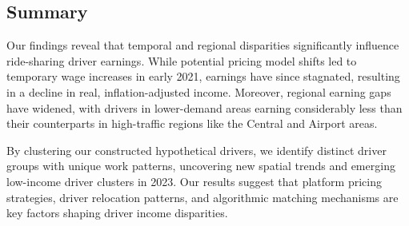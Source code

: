 \subsection{Summary}

Our findings reveal that temporal and regional disparities significantly influence ride-sharing driver earnings. While potential pricing model shifts led to temporary wage increases in early 2021, earnings have since stagnated, resulting in a decline in real, inflation-adjusted income. Moreover, regional earning gaps have widened, with drivers in lower-demand areas earning considerably less than their counterparts in high-traffic regions like the Central and Airport areas.

By clustering our constructed hypothetical drivers, we identify distinct driver groups with unique work patterns, uncovering new spatial trends and emerging low-income driver clusters in 2023. Our results suggest that platform pricing strategies, driver relocation patterns, and algorithmic matching mechanisms are key factors shaping driver income disparities.

